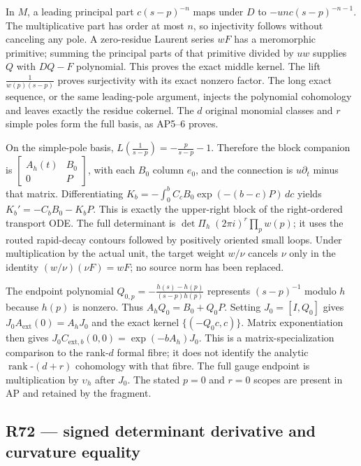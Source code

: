 In \(M\), a leading principal part \(c(s-p)^{-n}\) maps under \(D\) to
\(-unc(s-p)^{-n-1}\). The multiplicative part has order at most \(n\),
so injectivity follows without canceling any pole. A zero-residue
Laurent series \(wF\) has a meromorphic primitive; summing the principal
parts of that primitive divided by \(uw\) supplies \(Q\) with \(DQ-F\)
polynomial. This proves the exact middle kernel. The lift
\(\frac1{w(p)(s-p)}\) proves surjectivity with its exact nonzero factor.
The long exact sequence, or the same leading-pole argument, injects the
polynomial cohomology and leaves exactly the residue cokernel. The \(d\)
original monomial classes and \(r\) simple poles form the full basis, as
AP5--6 proves.

On the simple-pole basis,
\(L\!\left(\frac1{s-p}\right)=-\frac p{s-p}-1\). Therefore the block
companion is \(\begin{bmatrix}A_h(t)&B_0\\0&P\end{bmatrix}\), with each
\(B_0\) column \(e_0\), and the connection is \(u\partial_t\) minus that
matrix. Differentiating \(K_b=-\int_0^b C_c B_0\exp(-(b-c)P)\,dc\)
yields \(K_b'=-C_b B_0-K_b P\). This is exactly the upper-right block of
the right-ordered transport ODE. The full determinant is
\(\det\Pi_h\;(2\pi i)^r\prod_p w(p)\); it uses the routed rapid-decay
contours followed by positively oriented small loops. Under
multiplication by the actual unit, the target weight \(w/\nu\) cancels
\(\nu\) only in the identity \((w/\nu)(\nu F)=wF\); no source norm has
been replaced.

The endpoint polynomial \(Q_{0,p}=-\frac{h(s)-h(p)}{(s-p)h(p)}\)
represents \((s-p)^{-1}\) modulo \(h\) because \(h(p)\) is nonzero. Thus
\(A_h Q_0=B_0+Q_0P\). Setting \(J_0=[I,Q_0]\) gives
\(J_0A_{\mathrm{ext}}(0)=A_hJ_0\) and the exact kernel
\(\{(-Q_0c,c)\}\). Matrix exponentiation then gives
\(J_0C_{\mathrm{ext},b}(0,0)=\exp(-bA_h)J_0\). This is a
matrix-specialization comparison to the rank-\(d\) formal fibre; it does
not identify the analytic \(\operatorname{rank}\text{-}(d+r)\)
cohomology with that fibre. The full gauge endpoint is multiplication by
\(\upsilon_h\) after \(J_0\). The stated \(p=0\) and \(r=0\) scopes are
present in AP and retained by the fragment.

\subsection{R72 --- signed determinant derivative and curvature
equality}\label{r72-signed-determinant-derivative-and-curvature-equality}

